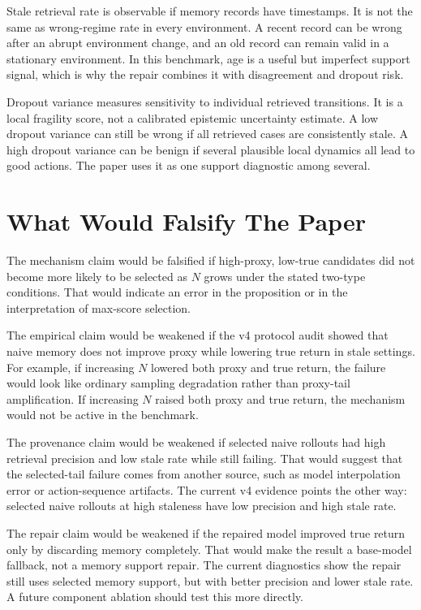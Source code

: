 \documentclass{article}
\begin{document}
Stale retrieval rate is observable if memory records have timestamps. It is
not the same as wrong-regime rate in every environment. A recent record can be
wrong after an abrupt environment change, and an old record can remain valid
in a stationary environment. In this benchmark, age is a useful but imperfect
support signal, which is why the repair combines it with disagreement and
dropout risk.

Dropout variance measures sensitivity to individual retrieved transitions. It
is a local fragility score, not a calibrated epistemic uncertainty estimate.
A low dropout variance can still be wrong if all retrieved cases are
consistently stale. A high dropout variance can be benign if several plausible
local dynamics all lead to good actions. The paper uses it as one support
diagnostic among several.

\section{What Would Falsify The Paper}
\label{app:falsification}

The mechanism claim would be falsified if high-proxy, low-true candidates did
not become more likely to be selected as $N$ grows under the stated two-type
conditions. That would indicate an error in the proposition or in the
interpretation of max-score selection.

The empirical claim would be weakened if the v4 protocol audit showed that naive memory
does not improve proxy while lowering true return in stale settings. For
example, if increasing $N$ lowered both proxy and true return, the failure
would look like ordinary sampling degradation rather than proxy-tail
amplification. If increasing $N$ raised both proxy and true return, the
mechanism would not be active in the benchmark.

The provenance claim would be weakened if selected naive rollouts had high
retrieval precision and low stale rate while still failing. That would suggest
that the selected-tail failure comes from another source, such as model
interpolation error or action-sequence artifacts. The current v4 evidence
points the other way: selected naive rollouts at high staleness have low
precision and high stale rate.

The repair claim would be weakened if the repaired model improved true return
only by discarding memory completely. That would make the result a base-model
fallback, not a memory support repair. The current diagnostics show the repair
still uses selected memory support, but with better precision and lower stale
rate. A future component ablation should test this more directly.
\end{document}
